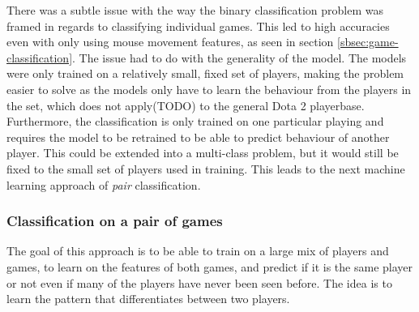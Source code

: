 \documentclass[Report.tex]{subfiles}
\begin{document}
There was a subtle issue with the way the binary classification problem was framed in regards to classifying individual games. This led to high accuracies even with only using mouse movement features, as seen in section \ref{sbsec:game-classification}. The issue had to do with the generality of the model. The models were only trained on a relatively small, fixed set of players, making the problem easier to solve as the models only have to learn the behaviour from the players in the set, which does not apply(TODO) to the general Dota 2 playerbase. Furthermore, the classification is only trained on one particular playing and requires the model to be retrained to be able to predict behaviour of another player. This could be extended into a multi-class problem, but it would still be fixed to the small set of players used in training. This leads to the next machine learning approach of \textit{pair} classification.

\subsubsection{Classification on a pair of games}
The goal of this approach is to be able to train on a large mix of players and games, to learn on the features of both games, and predict if it is the same player or not even if many of the players have never been seen before. The idea is to learn the pattern that differentiates between two players. 
\end{document}
